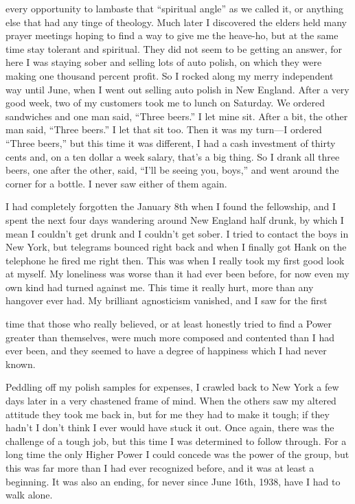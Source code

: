 \begin{biblechapter}
every opportunity to lambaste that “spiritual angle” as we called it, or anything else that had any tinge of theology. Much later I discovered the elders held many prayer meetings hoping to find a way to give me the heave-ho, but at the same time stay tolerant and spiritual. They did not seem to be getting an answer, for here I was staying sober and selling lots of auto polish, on which they were making one thousand percent profit. So I rocked along my merry independent way until June, when I went out selling auto polish in New England. After a very good week, two of my customers took me to lunch on Saturday. We ordered sandwiches and one man said, “Three beers.” I let mine sit. After a bit, the other man said, “Three beers.” I let that sit too. Then it was my turn—I ordered “Three beers,” but this time it was different, I had a cash investment of thirty cents and, on a ten dollar a week salary, that’s a big thing. So I drank all three beers, one after the other, said, “I’ll be seeing you, boys,” and went around the corner for a bottle. I never saw either of them again.

I had completely forgotten the January 8th when I found the fellowship, and I spent the next four days wandering around New England half drunk, by which I mean I couldn’t get drunk and I couldn’t get sober. I tried to contact the boys in New York, but telegrams bounced right back and when I finally got Hank on the telephone he fired me right then. This was when I really took my first good look at myself. My loneliness was worse than it had ever been before, for now even my own kind had turned against me. This time it really hurt, more than any hangover ever had. My brilliant agnosticism vanished, and I saw for the first

time that those who really believed, or at least honestly tried to find a Power greater than themselves, were much more composed and contented than I had ever been, and they seemed to have a degree of happiness which I had never known.

Peddling off my polish samples for expenses, I crawled back to New York a few days later in a very chastened frame of mind. When the others saw my altered attitude they took me back in, but for me they had to make it tough; if they hadn’t I don’t think I ever would have stuck it out. Once again, there was the challenge of a tough job, but this time I was determined to follow through. For a long time the only Higher Power I could concede was the power of the group, but this was far more than I had ever recognized before, and it was at least a beginning. It was also an ending, for never since June 16th, 1938, have I had to walk alone.


\end{biblechapter}
